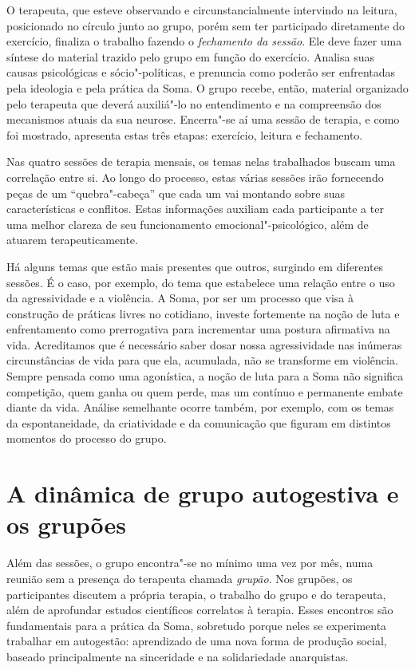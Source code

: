 O terapeuta, que esteve observando e circunstancialmente intervindo na
leitura, posicionado no círculo junto ao grupo, porém sem ter
participado diretamente do exercício, finaliza o trabalho fazendo o
\emph{fechamento da sessão}. Ele deve fazer uma síntese do material
trazido pelo grupo em função do exercício. Analisa suas causas
psicológicas e sócio"-políticas, e prenuncia como poderão ser enfrentadas
pela ideologia e pela prática da Soma. O grupo recebe, então, material
organizado pelo terapeuta que deverá auxiliá"-lo no entendimento e na
compreensão dos mecanismos atuais da sua neurose. Encerra"-se aí uma
sessão de terapia, e como foi mostrado, apresenta estas três etapas:
exercício, leitura e fechamento.

Nas quatro sessões de terapia mensais, os temas nelas trabalhados buscam
uma correlação entre si. Ao longo do processo, estas várias sessões irão
fornecendo peças de um ``quebra"-cabeça'' que cada um vai montando sobre
suas características e conflitos. Estas informações auxiliam cada
participante a ter uma melhor clareza de seu funcionamento
emocional"-psicológico, além de atuarem terapeuticamente.

Há alguns temas que estão mais presentes que outros, surgindo em
diferentes sessões. É o caso, por exemplo, do tema que estabelece uma
relação entre o uso da agressividade e a violência. A Soma, por ser um
processo que visa à construção de práticas livres no cotidiano, investe
fortemente na noção de luta e enfrentamento como prerrogativa para
incrementar uma postura afirmativa na vida. Acreditamos que é necessário
saber dosar nossa agressividade nas inúmeras circunstâncias de vida para
que ela, acumulada, não se transforme em violência. Sempre pensada como
uma agonística, a noção de luta para a Soma não significa competição,
quem ganha ou quem perde, mas um contínuo e permanente embate
diante da vida. Análise semelhante ocorre também, por exemplo, com os
temas da espontaneidade, da criatividade e da comunicação que figuram em
distintos momentos do processo do grupo.

\section{A dinâmica de grupo autogestiva e os grupões}

Além das sessões, o grupo encontra"-se no mínimo uma vez por mês, numa
reunião sem a presença do terapeuta chamada \emph{grupão}. Nos grupões,
os participantes discutem a própria terapia, o trabalho do grupo e do
terapeuta, além de aprofundar estudos científicos correlatos à terapia.
Esses encontros são fundamentais para a prática da Soma, sobretudo
porque neles se experimenta trabalhar em autogestão: aprendizado de uma
nova forma de produção social, baseado principalmente na sinceridade e
na solidariedade anarquistas.

